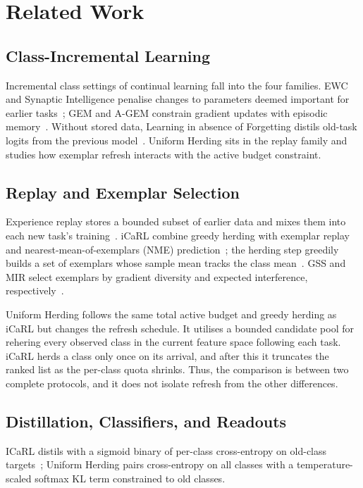 
\section{Related Work}
\label{sec:related-work}

\subsection{Class-Incremental Learning}
\label{subsec:related-cil}

Incremental class settings of continual learning fall into the four families.  EWC and Synaptic Intelligence penalise changes to parameters deemed important for earlier tasks~\cite{kirkpatrick2017ewc,zenke2017si}; GEM and A-GEM constrain gradient updates with episodic memory~\cite{lopezpaz2017gem,chaudhry2019agem}. Without stored data, Learning in absence of Forgetting distils old-task logits from the previous model~\cite{li2016lwf}.  Uniform Herding sits in the replay family and studies how exemplar refresh interacts with the active budget constraint.

\subsection{Replay and Exemplar Selection}
\label{subsec:related-replay}

Experience replay stores a bounded subset of earlier data and mixes them into each
new task's training~\cite{rolnick2019er,chaudhry2019tiny}.  iCaRL combine
greedy herding with exemplar replay and nearest-mean-of-exemplars (NME)
prediction~\cite{rebuffi2017icarl}; the herding step greedily builds a set of exemplars whose sample mean tracks the class
mean~\cite{welling2009herding}.  GSS and MIR select exemplars by gradient
diversity and expected interference,
respectively~\cite{aljundi2019gss,aljundi2019mir}.

Uniform Herding follows the same total active budget and greedy herding as
iCaRL but changes the refresh schedule.  It utilises a bounded candidate pool for rehering every observed class in the current feature space following each task. iCaRL herds a class only once on its arrival, and after this it truncates the ranked list
as the per-class quota shrinks.  Thus, the comparison is between
two complete protocols, and it does not isolate refresh from the other
differences.

\subsection{Distillation, Classifiers, and Readouts}
\label{subsec:related-readout}
ICaRL distils with a sigmoid binary of per-class cross-entropy on old-class
targets~\cite{rebuffi2017icarl}; Uniform Herding pairs cross-entropy on all
classes with a temperature-scaled softmax KL term constrained to old classes.

